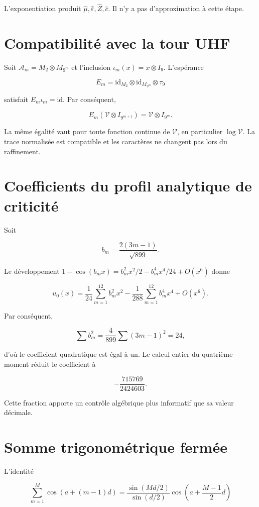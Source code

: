 L’exponentiation produit \(\widehat\mu,\widehat\varepsilon,\widehat Z,\widehat c\). Il n’y a pas d’approximation à cette étape.

\section{Compatibilité avec la tour UHF}

Soit \(\mathcal A_m=M_2\otimes M_{9^m}\) et l’inclusion \(\iota_m(x)=x\otimes I_9\). L’espérance

\[
E_m=\mathrm{id}_{M_2}\otimes\mathrm{id}_{M_{9^m}}\otimes\tau_9
\]

satisfait \(E_m\iota_m=\mathrm{id}\). Par conséquent,

\[
E_m(\mathcal V\otimes I_{9^{m+1}})
=\mathcal V\otimes I_{9^m}.
\]

La même égalité vaut pour toute fonction continue de \(\mathcal V\), en particulier \(\log\mathcal V\). La trace normalisée est compatible et les caractères ne changent pas lors du raffinement.

\section{Coefficients du profil analytique de criticité}

Soit

\[
b_m=\frac{2(3m-1)}{\sqrt{899}}.
\]

Le développement \(1-\cos(b_mx)=b_m^2x^2/2-b_m^4x^4/24+O(x^6)\) donne

\[
u_0(x)=\frac1{24}\sum_{m=1}^{12}b_m^2x^2
-\frac1{288}\sum_{m=1}^{12}b_m^4x^4+O(x^6).
\]

Par conséquent,

\[
\sum b_m^2=\frac4{899}\sum(3m-1)^2=24,
\]

d’où le coefficient quadratique est égal à un. Le calcul entier du quatrième moment réduit le coefficient à

\[
-\frac{715769}{2424603}.
\]

Cette fraction apporte un contrôle algébrique plus informatif que sa valeur
décimale.

\section{Somme trigonométrique fermée}

L’identité

\[
\sum_{m=1}^{M}\cos(a+(m-1)d)
=\frac{\sin(Md/2)}{\sin(d/2)}
\cos\!\left(a+\frac{M-1}{2}d\right)
\]

